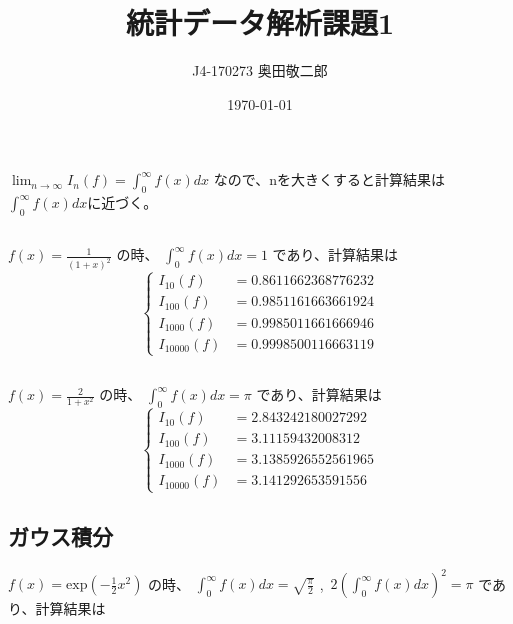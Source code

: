 \documentclass{jsarticle}
\begin{document}
\title{統計データ解析課題1}
\author{J4-170273 奥田敬二郎}
\date{\today}
\maketitle

\section{}
$
\displaystyle \lim_{n \to \infty} I_n(f) = \int_{0}^{\infty} f(x) dx
$
なので、nを大きくすると計算結果は$\displaystyle \int_{0}^{\infty} f(x) dx$に近づく。

\subsection{}
$\displaystyle f(x) = \frac{1}{(1+x)^2}$
の時、
$\displaystyle \int_{0}^{\infty} f(x) dx = 1$
であり、計算結果は
\[
\left\{
	\begin{alignedat}{2}
		I_{10}(f) &= 0.8611662368776232\\
		I_{100}(f) &= 0.9851161663661924\\
		I_{1000}(f) &= 0.9985011661666946\\
		I_{10000}(f) &= 0.9998500116663119
	\end{alignedat}
\right.
\]

\subsection{}
$\displaystyle f(x) = \frac{2}{1+x^2}$
の時、
$\displaystyle \int_{0}^{\infty} f(x) dx = \pi$
であり、計算結果は
\[
\left\{
	\begin{alignedat}{2}
		I_{10}(f) &= 2.843242180027292\\
		I_{100}(f) &= 3.11159432008312\\
		I_{1000}(f) &= 3.1385926552561965\\
		I_{10000}(f) &= 3.141292653591556
	\end{alignedat}
\right.
\]

\subsection{ガウス積分}
$\displaystyle f(x) = \mathrm{exp}\left(-\frac{1}{2}x^2\right)$
の時、
$\displaystyle \int_{0}^{\infty} f(x) dx = \sqrt{\frac{\pi}{2}}$ , $\displaystyle \, 2 \left(\int_{0}^{\infty} f(x) dx\right)^2 = \pi$
であり、計算結果は
\end{document}
